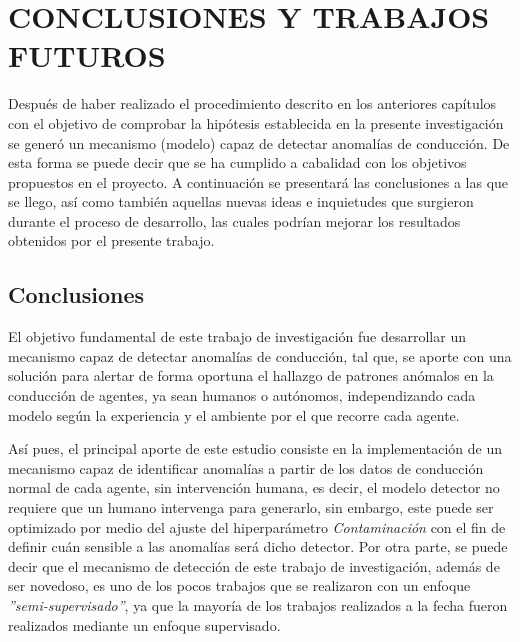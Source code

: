  

\chapter{\uppercase{Conclusiones y trabajos futuros}}
\label{Capitulo 7}

Despu\'{e}s de haber realizado el procedimiento descrito en los anteriores cap\'{i}tulos con el objetivo de comprobar la hip\'{o}tesis establecida en la presente investigaci\'{o}n se gener\'{o} un mecanismo (modelo) capaz de detectar anomal\'{i}as de conducci\'{o}n. De esta forma se puede decir que se ha cumplido a cabalidad con los objetivos propuestos en el proyecto. A continuaci\'{o}n se presentar\'{a} las conclusiones a las que se llego, as\'{i} como tambi\'{e}n aquellas nuevas ideas e inquietudes que surgieron durante el proceso de desarrollo, las cuales podr\'{i}an mejorar los resultados obtenidos por el presente trabajo.

\section{Conclusiones}

El objetivo fundamental de este trabajo de investigaci\'{o}n fue desarrollar un mecanismo capaz de detectar anomal\'{i}as de conducci\'{o}n, tal que, se aporte con una soluci\'{o}n para alertar de forma oportuna el hallazgo de patrones an\'{o}malos en la conducci\'{o}n de agentes, ya sean humanos o aut\'{o}nomos, independizando cada modelo seg\'{u}n la experiencia y el ambiente por el que recorre cada agente.

\vspace{5mm} %

As\'{i} pues, el principal aporte de este estudio consiste en la implementaci\'{o}n de un mecanismo capaz de identificar anomal\'{i}as a partir de los datos de conducci\'{o}n normal de cada agente, sin intervenci\'{o}n humana, es decir, el modelo detector no requiere que un humano intervenga para generarlo, sin embargo, este puede ser optimizado por medio del ajuste del hiperpar\'{a}metro \textit{Contaminaci\'{o}n} con el fin de definir cu\'{a}n sensible a las anomal\'{i}as ser\'{a} dicho detector. Por otra parte, se puede decir que el mecanismo de detecci\'{o}n de este trabajo de investigaci\'{o}n, adem\'{a}s de ser novedoso, es uno de los pocos trabajos que se realizaron con un enfoque \textit{''semi-supervisado''}, ya que la mayor\'{i}a de los trabajos realizados a la fecha fueron realizados mediante un enfoque supervisado.

